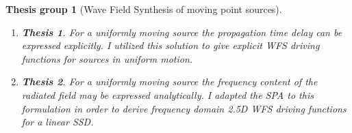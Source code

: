 \documentclass[10pt,twoside]{article}
\theoremstyle{thesisgroupstyle}
\newtheorem{thesisgroup}{Thesis group}
\newtheorem{thesis}{Thesis}[thesisgroup]
\begin{document}
\begin{thesisgroup}[Wave Field Synthesis of moving point sources]
\begin{enumerate}
\item[] \vspace{-7mm}\begin{thesis}For a uniformly moving source the propagation time delay can be expressed explicitly.
I utilized this solution to give explicit WFS driving functions for sources in uniform motion.\end{thesis}
\item[] \vspace{-7mm}\begin{thesis}For a uniformly moving source the frequency content of the radiated field may be expressed analytically.
I adapted the SPA to this formulation in order to derive frequency domain 2.5D WFS driving functions for a linear SSD.\end{thesis}
\end{enumerate}
\end{thesisgroup}
\end{document}
